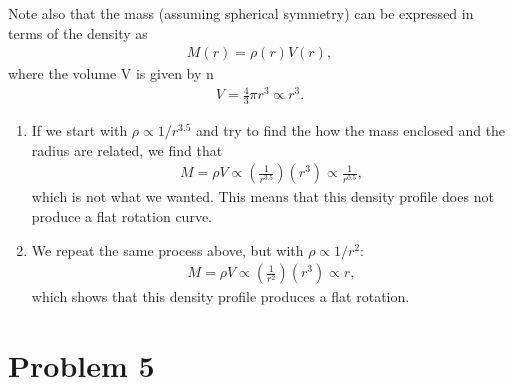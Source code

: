 \documentclass[11pt,letterpaper]{article}
\begin{document}
        Note also that the mass (assuming spherical symmetry) can be expressed in terms of the density as 
        \begin{align*}
            M(r) = \rho(r) V(r),
        \end{align*}
        where the volume V is given by n
        \begin{align*}
            V = \frac{4}{3}\pi r^3 \propto r^3.
        \end{align*}

\begin{enumerate}[label=(\alph*)]
            \item If we start with $\rho \propto 1/r^{3.5}$ and try to find the how the mass enclosed and the radius are related, we find that 
        \begin{align*}
            M = \rho V \propto (\frac{1}{r^{3.5}}) (r^{3}) \propto \frac{1}{r^{0.5}},
        \end{align*}
        which is not what we wanted. This means that this density profile does not produce a flat rotation curve. 
    \item We repeat the same process above, but with $\rho \propto 1/r^{2}$:
        \begin{align*}
            M = \rho V \propto (\frac{1}{r^{2}}) (r^{3}) \propto r,
        \end{align*}
        which shows that this density profile produces a flat rotation.
\end{enumerate}

\section*{Problem 5} 
\end{document}
